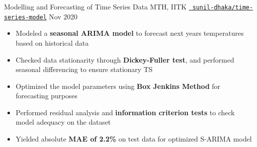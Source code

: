 \cventry
{Modelling and Forecasting of Time Series Data}
{MTH, IITK}
{\texttt{\href{https://github.com/sunil-dhaka/time-series-model}{\faGithub{} sunil-dhaka/time-series-model}}}
{Nov 2020}
{
  \begin{itemize}
    \item Modeled a \textbf{seasonal ARIMA model} to forecast next years temperatures based on historical data 
    \item Checked data stationarity through \textbf{Dickey-Fuller test}, and performed seasonal differencing to ensure stationary TS
    \item Optimized the model parameters using \textbf{Box Jenkins Method} for forecasting purposes
    \item Performed residual analysis and \textbf{information criterion tests} to check model adequacy on the dataset
    \item Yielded absolute \textbf{MAE of 2.2\%} on test data for optimized S-ARIMA model  
  \end{itemize}
}

\vspace{-2mm}

